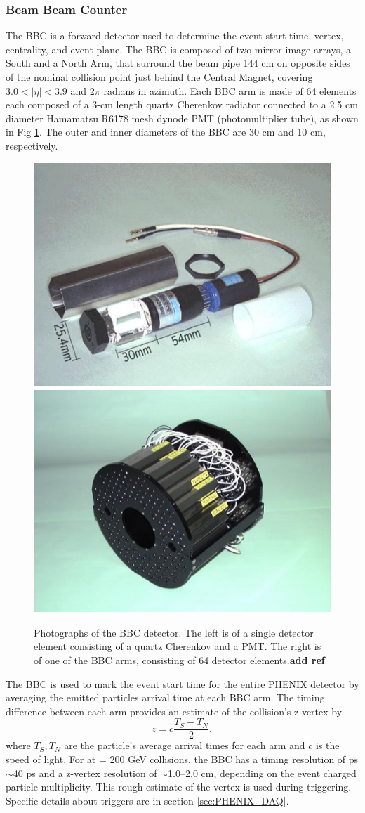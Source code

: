 \subsubsection{Beam Beam Counter}
The BBC is a forward detector used to determine the event start time, vertex, centrality, and event plane. The BBC is composed of two mirror image arrays, a South and a North Arm, that surround the beam pipe 144 cm on opposite sides of the nominal collision point just behind the Central Magnet, covering $3.0 < |\eta| < 3.9$ and 2$\pi$ radians in azimuth. Each BBC arm is made of 64 elements each composed of a 3-cm length quartz Cherenkov radiator connected to a 2.5 cm diameter Hamamatsu R6178 mesh dynode PMT (photomultiplier tube), as shown in Fig \ref{fig:bbc_dector}. The outer and inner diameters of the BBC are 30 cm and 10 cm, respectively.%
\begin{figure}[!ht]
\begin{center}
\includegraphics[width=0.45\linewidth]{figs/bbc_pmt.png}
\includegraphics[width=0.45\linewidth]{figs/bbc_arm.png}
\caption{Photographs of the BBC detector. The left is of a single detector element consisting of a quartz Cherenkov and a PMT. The right is of one of the BBC arms, consisting of 64 detector elements.\textbf{add ref}}
\label{fig:bbc_dector}
\end{center}
\end{figure}

The BBC is used to mark the event start time for the entire PHENIX detector by averaging the emitted particles arrival time at each BBC arm. The timing difference between each arm provides an estimate of the collision's z-vertex by
\begin{equation}
z = c \frac{T_S - T_N}{2},
\end{equation}
where $T_S, T_N$ are the particle's average arrival times for each arm and $c$ is the speed of light.%
For \pau at \sqsn = 200 GeV collisions, the BBC has a timing resolution of ps $\sim$40 ps and a z-vertex resolution of $\sim$1.0--2.0 cm, depending on the event charged particle multiplicity. This rough estimate of the vertex is used during triggering. Specific details about triggers are in section \ref{sec:PHENIX_DAQ}.

